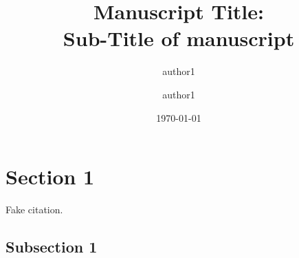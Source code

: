 \documentclass[%
preprint,
 amsmath,
 amssymb,
 aps,
]{revtex4-2}
\begin{document}
\title{Manuscript Title:\\Sub-Title of manuscript }%

\author{author1}%
\author{author1}%
%


\date{\today}

\begin{abstract}
\lipsum[1]
\end{abstract}

\maketitle


\section{Section 1}

\lipsum[1-4] Fake citation.

\subsection{Subsection 1}

\lipsum[1-4]



\end{document}
